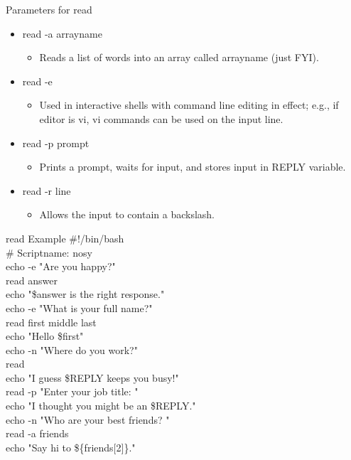 \documentclass{beamer}
\begin{document}
\begin{frame}{Parameters for read}
\begin{itemize}
\item read -a arrayname 
\begin{itemize}
\item Reads a list of words into an array called arrayname (just FYI).
\end{itemize}
\item read -e 
\begin{itemize}
\item Used in interactive shells with command line editing in effect; e.g., if editor is vi, vi commands can be used on the input line.
\end{itemize}
\item read -p prompt 
\begin{itemize}
\item Prints a prompt, waits for input, and stores input in REPLY variable.
\end{itemize}
\item read -r line 
\begin{itemize}
\item Allows the input to contain a backslash.
\end{itemize}
\end{itemize}
\end{frame}

\begin{frame}{read Example}
\#!/bin/bash \\
\# Scriptname: nosy\\
echo -e "Are you happy?"\\
read answer\\
echo "\$answer is the right response."\\
echo -e "What is your full name?"\\
read first middle last\\
echo "Hello \$first"\\
echo -n "Where do you work?"\\
read \\
echo "I guess \$REPLY keeps you busy!" \\
read -p "Enter your job title: " \\
echo "I thought you might be an \$REPLY."  \\
echo -n "Who are your best friends? "  \\
read -a friends \\
echo "Say hi to \$\{friends$[$2$]$\}." 
\end{frame}
\end{document}
